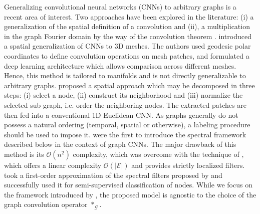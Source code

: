 \documentclass{article} %
\newcommand{\bO}{\mathcal{O}}
\newcommand{\G}{\mathcal{G}}
\newcommand{\E}{\mathcal{E}}
\newcommand{\todo}[1]{{\color{red} #1 }}
\begin{document}
Generalizing convolutional neural networks (CNNs) to arbitrary graphs is a
recent area of interest. Two approaches have been explored in the literature: (i) a
generalization of the spatial definition of a convolution \citep{gcnn_masci,
gcnn_niepert} and (ii), a multiplication in the graph Fourier domain by the way
of the convolution theorem \citep{gcnn_bruna, gcnn}. \citet{gcnn_masci}
introduced a spatial generalization of CNNs to 3D meshes. The authors used
geodesic polar coordinates to define convolution operations on mesh patches,
and formulated a deep learning architecture which allows comparison across
different meshes.  Hence, this method is tailored to manifolds and is not directly
generalizable to arbitrary graphs. \citet{gcnn_niepert} proposed a spatial
approach which may be decomposed in three steps: (i) select a node, (ii)
construct its neighborhood and (iii) normalize the selected sub-graph, i.e.
order the neighboring nodes. The extracted patches are then fed into a
conventional 1D Euclidean CNN. As graphs generally do not possess a natural ordering
(temporal, spatial or otherwise), a labeling procedure should be used to impose
it. \citet{gcnn_bruna} were the first to introduce the spectral framework
described below in the context of graph CNNs. The major drawback of this
method is its $\bO(n^2)$ complexity, which was overcome with the technique of \citet{gcnn}, which offers a linear complexity $\bO(|\E|)$ and provides strictly localized
filters. \citet{gcnn_kipf} took a first-order approximation of the spectral
filters proposed by \citet{gcnn} and successfully used it for semi-supervised
classification of nodes. While we focus on the framework introduced by
\citet{gcnn}, the proposed model is agnostic to the choice of the graph
convolution operator $\ast_\G$. %
\end{document}
